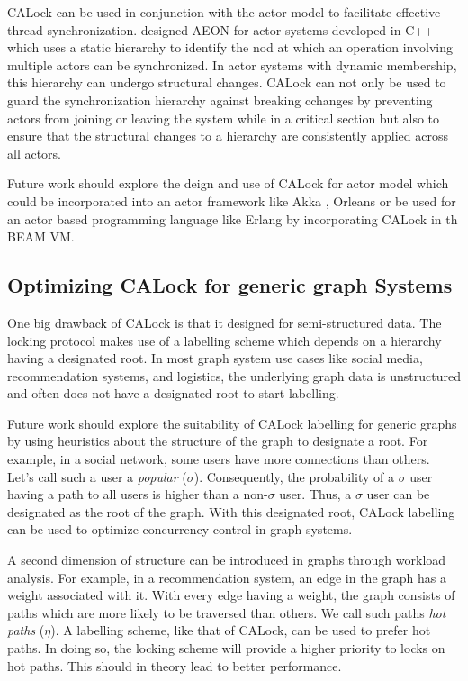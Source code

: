 CALock can be used in conjunction with the actor model to facilitate effective thread synchronization. \citet{sang_scalable_2020} designed AEON for actor systems developed in C++ which uses a static hierarchy to identify the nod at which an operation involving multiple actors can be synchronized. In actor systems with dynamic membership, this hierarchy can undergo structural changes. CALock can not only be used to guard the synchronization hierarchy against breaking cchanges by preventing actors from joining or leaving the system while in a critical section but also to ensure that the structural changes to a hierarchy are consistently applied across all actors.

Future work should explore the deign and use of CALock for actor model which could be incorporated into an actor framework like Akka \cite{10.5555/2663429}, Orleans \cite{10.1145/2038916.2038932} or be used for an actor based programming language like Erlang \cite{armstrong1991erlang} by incorporating CALock in th BEAM VM.

\subsection{Optimizing CALock for generic graph Systems}

One big drawback of CALock is that it designed for semi-structured data. The locking protocol makes use of a labelling scheme which depends on a hierarchy having a designated root. In most graph system use cases like social media, recommendation systems, and logistics, the underlying graph data is unstructured and often does not have a designated root to start labelling. 

Future work should explore the suitability of CALock labelling for generic graphs by using heuristics about the structure of the graph to designate a root. For example, in a social network, some users have more connections than others. Let's call such a user a \emph{popular} ($\sigma$). Consequently, the probability of a $\sigma$ user having a path to all users is higher than a non-$\sigma$ user. Thus, a $\sigma$ user can be designated as the root of the graph. With this designated root, CALock labelling can be used to optimize concurrency control in graph systems.

A second dimension of structure can be introduced in graphs through workload analysis. For example, in a recommendation system, an edge in the graph has a weight associated with it. With every edge having a weight, the graph consists of paths which are more likely to be traversed than others. We call such paths \emph{hot paths} ($\eta$). A labelling scheme, like that of CALock, can be used to prefer hot paths. In doing so, the locking scheme will provide a higher priority to locks on hot paths. This should in theory lead to better performance. 



